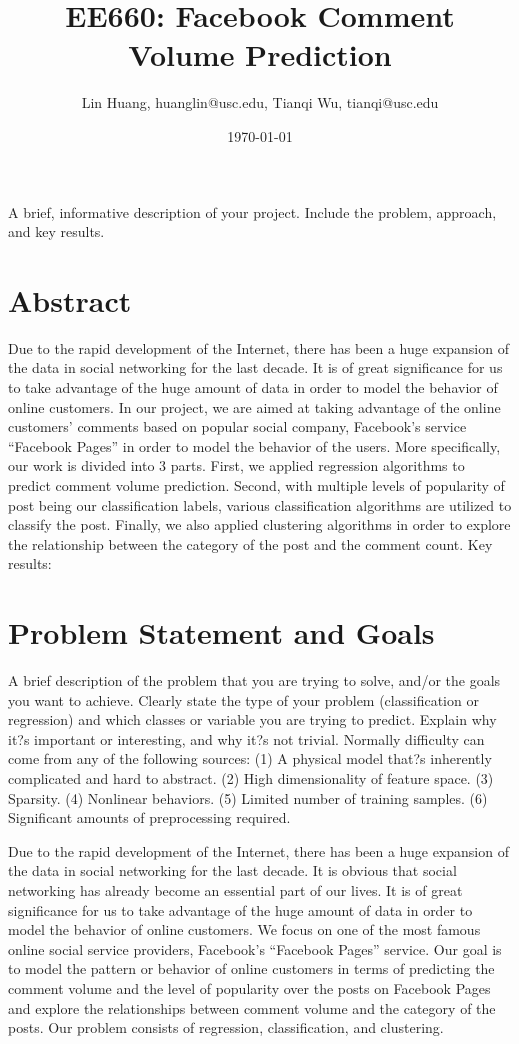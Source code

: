 \documentclass[12pt]{article}%
\begin{document}
\title{EE660: Facebook Comment Volume Prediction}
\author{Lin Huang, huanglin@usc.edu, Tianqi Wu, tianqi@usc.edu}
\date{\today}
\maketitle

A brief, informative description of your project. Include the problem, approach, and key results.
\tableofcontents
\section{Abstract}
Due to the rapid development of the Internet, there has been a huge expansion of the data in social networking for the last decade. It is of great significance for us to take advantage of the huge amount of data in order to model the behavior of online customers. In our project, we are aimed at taking advantage of the online customers' comments based on popular social company, Facebook's service ``Facebook Pages'' in order to model the behavior of the users. More specifically, our work is divided into 3 parts. First, we applied regression algorithms to predict comment volume prediction. Second, with multiple levels of popularity of post being our classification labels, various classification algorithms are utilized to classify the post. Finally, we also applied clustering algorithms in order to explore the relationship between the category of the post and the comment count.  Key results: 

\section{Problem Statement and Goals}
A brief description of the problem that you are trying to solve, and/or the goals you want to achieve. Clearly state the type of your problem (classification or regression) and which classes or variable you are trying to predict. Explain why it?s important or interesting, and why it?s not trivial.
Normally difficulty can come from any of the following sources:
(1) A physical model that?s inherently complicated and hard to abstract. (2) High dimensionality of feature space.
(3) Sparsity.
(4) Nonlinear behaviors.
(5) Limited number of training samples.
(6) Significant amounts of preprocessing required.

Due to the rapid development of the Internet, there has been a huge expansion of the data in social networking for the last decade. It is obvious that social networking has already become an essential part of our lives. It is of great significance for us to take advantage of the huge amount of data in order to model the behavior of online customers. We focus on one of the most famous online social service providers, Facebook's ``Facebook Pages'' service. Our goal is to model the pattern or behavior of online customers in terms of predicting the comment volume and the level of popularity over the posts on Facebook Pages and explore the relationships between comment volume and the category of the posts. Our problem consists of regression, classification, and clustering. 
\end{document}
